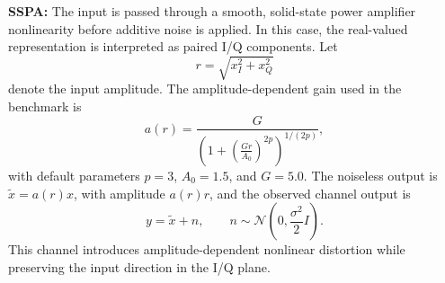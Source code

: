 \documentclass[conference]{IEEEtran}
\begin{document}
\textbf{SSPA:}
The input is passed through a smooth, solid-state power amplifier nonlinearity before additive noise is applied.
In this case, the real-valued representation is interpreted as paired I/Q components.
Let
\begin{equation}
r = \sqrt{x_I^2 + x_Q^2}
\end{equation}
denote the input amplitude.
The amplitude-dependent gain used in the benchmark is
\begin{equation}
a(r)
=
\frac{G}{\left(1+\left(\frac{Gr}{A_0}\right)^{2p}\right)^{1/(2p)}},
\end{equation}
with default parameters \(p=3\), \(A_0=1.5\), and \(G=5.0\).
The noiseless output is \(\tilde{x}=a(r)x\), with amplitude \(a(r)r\), and the observed channel output is
\begin{equation}
y = \tilde{x} + n,
\qquad
n \sim \mathcal{N}\!\left(0,\frac{\sigma^2}{2}I\right).
\end{equation}
This channel introduces amplitude-dependent nonlinear distortion while preserving the input direction in the I/Q plane.

\end{document}
